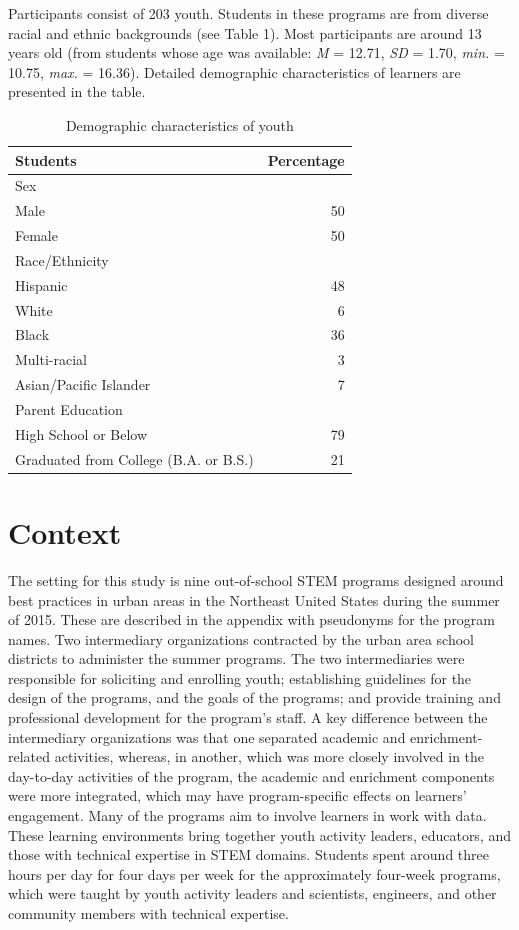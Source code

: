 \documentclass[]{msu-thesis}
\theoremstyle{definition}
\theoremstyle{definition}
\theoremstyle{definition}
\theoremstyle{remark}
\begin{document}
Participants consist of 203 youth. Students in these programs are from
diverse racial and ethnic backgrounds (see Table 1). Most participants
are around 13 years old (from students whose age was available: \emph{M}
= 12.71, \emph{SD} = 1.70, \emph{min.} = 10.75, \emph{max.} = 16.36).
Detailed demographic characteristics of learners are presented in the
table.

\begin{table}

\caption{\label{tab:unnamed-chunk-4}Demographic characteristics of youth}
\centering
\begin{tabular}[t]{lr}
\toprule
Students & Percentage\\
\midrule
Sex & \\
Male & 50\\
Female & 50\\
Race/Ethnicity & \\
Hispanic & 48\\
\addlinespace
White & 6\\
Black & 36\\
Multi-racial & 3\\
Asian/Pacific Islander & 7\\
Parent Education & \\
\addlinespace
High School or Below & 79\\
Graduated from College (B.A. or B.S.) & 21\\
\bottomrule
\end{tabular}
\end{table}

\section{Context}\label{context}

The setting for this study is nine out-of-school STEM programs designed
around best practices in urban areas in the Northeast United States
during the summer of 2015. These are described in the appendix with
pseudonyms for the program names. Two intermediary organizations
contracted by the urban area school districts to administer the summer
programs. The two intermediaries were responsible for soliciting and
enrolling youth; establishing guidelines for the design of the programs,
and the goals of the programs; and provide training and professional
development for the program's staff. A key difference between the
intermediary organizations was that one separated academic and
enrichment-related activities, whereas, in another, which was more
closely involved in the day-to-day activities of the program, the
academic and enrichment components were more integrated, which may have
program-specific effects on learners' engagement. Many of the programs
aim to involve learners in work with data. These learning environments
bring together youth activity leaders, educators, and those with
technical expertise in STEM domains. Students spent around three hours
per day for four days per week for the approximately four-week programs,
which were taught by youth activity leaders and scientists, engineers,
and other community members with technical expertise.
\end{document}
